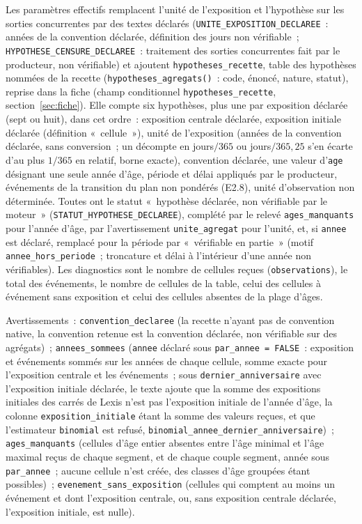 \documentclass[a4paper,11pt]{article}
\newcommand{\code}[1]{\texttt{\small #1}}
\begin{document}
\medskip
Les paramètres effectifs remplacent l'unité de l'exposition et l'hypothèse
sur les sorties concurrentes par des textes déclarés
(\code{UNITE\_EXPOSITION\_DECLAREE}~: années de la convention déclarée,
définition des jours non vérifiable~; \code{HYPOTHESE\_CENSURE\_DECLAREE}~:
traitement des sorties concurrentes fait par le producteur, non vérifiable)
et ajoutent \code{hypotheses\_recette}, table des hypothèses nommées de la
recette (\code{hypotheses\_agregats()}~: code, énoncé, nature, statut),
reprise dans la fiche (champ conditionnel \code{hypotheses\_recette},
section~\ref{sec:fiche}). Elle compte six hypothèses, plus une par
exposition déclarée (sept ou huit), dans cet ordre~: exposition centrale
déclarée, exposition initiale déclarée (définition «~cellule~»), unité
de l'exposition (années de la convention déclarée, sans conversion~; un
décompte en jours$/365$ ou jours$/365{,}25$ s'en écarte d'au plus $1/365$ en
relatif, borne exacte), convention déclarée, une valeur d'\code{age}
désignant une seule année d'âge, période et délai appliqués par le
producteur, événements de la transition du plan non pondérés (E2.8), unité
d'observation non déterminée. Toutes ont le statut «~hypothèse déclarée,
non vérifiable par le moteur~» (\code{STATUT\_HYPOTHESE\_DECLAREE}),
complété par le relevé \code{ages\_manquants} pour l'année d'âge, par
l'avertissement \code{unite\_agregat} pour l'unité, et, si \code{annee}
est déclaré, remplacé pour la période par «~vérifiable en partie~» (motif
\code{annee\_hors\_periode}~; troncature et délai à l'intérieur d'une
année non vérifiables). Les diagnostics sont le nombre de cellules reçues
(\code{observations}), le total des événements, le nombre de cellules de
la table, celui des cellules à événement sans exposition et celui des
cellules absentes de la plage d'âges.

\medskip
Avertissements~: \code{convention\_declaree} (la recette n'ayant pas de
convention native, la convention retenue est la convention déclarée, non
vérifiable sur des agrégats)~; \code{annees\_sommees} (\code{annee}
déclaré sous \code{par\_annee = FALSE}~: exposition et événements sommés
sur les années de chaque cellule, somme exacte pour l'exposition centrale
et les événements~; sous \code{dernier\_anniversaire} avec l'exposition
initiale déclarée, le texte ajoute que la somme des expositions initiales
des carrés de Lexis n'est pas l'exposition initiale de l'année d'âge, la
colonne \code{exposition\_initiale} étant la somme des valeurs reçues, et
que l'estimateur \code{binomial} est refusé, \code{binomial\_annee\_}\allowbreak\code{dernier\_anniversaire})~;
\code{ages\_manquants} (cellules d'âge entier absentes entre l'âge minimal
et l'âge maximal reçus de chaque segment, et de chaque couple segment,
année sous \code{par\_annee}~; aucune cellule n'est créée, des classes
d'âge groupées étant possibles)~; \code{evenement\_sans\_exposition}
(cellules qui comptent au moins un événement et dont l'exposition centrale,
ou, sans exposition centrale déclarée, l'exposition initiale, est nulle).
\end{document}
